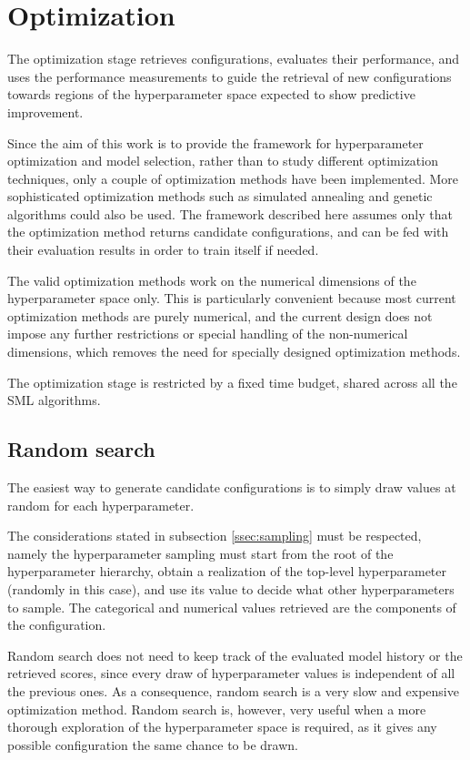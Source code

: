 \section{Optimization}

The optimization stage retrieves configurations, evaluates their performance, and uses the
performance measurements to guide the retrieval of new configurations towards regions of the
hyperparameter space expected to show predictive improvement.

Since the aim of this work is to provide the framework for hyperparameter optimization and model
selection, rather than to study different optimization techniques, only a couple of optimization
methods have been implemented. More sophisticated optimization methods such as simulated annealing
and genetic algorithms could also be used. The framework described here assumes only that the
optimization method returns candidate configurations, and can be fed with their evaluation results
in order to train itself if needed.

The valid optimization methods work on the numerical dimensions of the hyperparameter space
only. This is particularly convenient because most current optimization methods are purely
numerical, and the current design does not impose any further restrictions or special handling of
the non-numerical dimensions, which removes the need for specially designed optimization methods.

The optimization stage is restricted by a fixed time budget, shared across all the SML algorithms.

\subsection{Random search}

The easiest way to generate candidate configurations is to simply draw values at random for each
hyperparameter.

The considerations stated in  subsection \ref{ssec:sampling} must be respected, namely the
hyperparameter sampling must start from the root of the hyperparameter hierarchy, obtain a
realization of the top-level hyperparameter (randomly in this case), and use its value to decide
what other hyperparameters to sample. The categorical and numerical values retrieved are the
components of the configuration.

Random search does not need to keep track of the evaluated model history or the retrieved scores,
since every draw of hyperparameter values is independent of all the previous ones. As a consequence,
random search is a very slow and expensive optimization method. Random search is, however, very
useful when a more thorough exploration of the hyperparameter space is required, as it gives any
possible configuration the same chance to be drawn.

